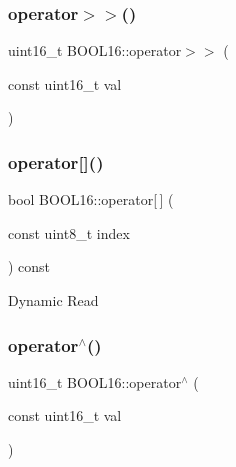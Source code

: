 \hypertarget{struct_b_o_o_l16_a0d8f006fbd86c927238a4d1420c3c6a1}{}\label{struct_b_o_o_l16_a0d8f006fbd86c927238a4d1420c3c6a1} 
\subsubsection{\texorpdfstring{operator$>$$>$()}{operator>>()}}
{\footnotesize\ttfamily uint16\+\_\+t B\+O\+O\+L16\+::operator$>$$>$ (\begin{DoxyParamCaption}\item[{const uint16\+\_\+t}]{val }\end{DoxyParamCaption})\hspace{0.3cm}{\ttfamily [inline]}}

\hypertarget{struct_b_o_o_l16_ae2e6627d3440c7132acd1933d27b7ac8}{}\label{struct_b_o_o_l16_ae2e6627d3440c7132acd1933d27b7ac8} 
\subsubsection{\texorpdfstring{operator[]()}{operator[]()}}
{\footnotesize\ttfamily bool B\+O\+O\+L16\+::operator\mbox{[}$\,$\mbox{]} (\begin{DoxyParamCaption}\item[{const uint8\+\_\+t}]{index }\end{DoxyParamCaption}) const\hspace{0.3cm}{\ttfamily [inline]}}

Dynamic Read \hypertarget{struct_b_o_o_l16_a7c6eec752dc57d5c27d8d5109bac10f7}{}\label{struct_b_o_o_l16_a7c6eec752dc57d5c27d8d5109bac10f7} 
\subsubsection{\texorpdfstring{operator$^\wedge$()}{operator^()}\hspace{0.1cm}{\footnotesize\ttfamily [1/2]}}
{\footnotesize\ttfamily uint16\+\_\+t B\+O\+O\+L16\+::operator$^\wedge$ (\begin{DoxyParamCaption}\item[{const uint16\+\_\+t}]{val }\end{DoxyParamCaption})\hspace{0.3cm}{\ttfamily [inline]}}

